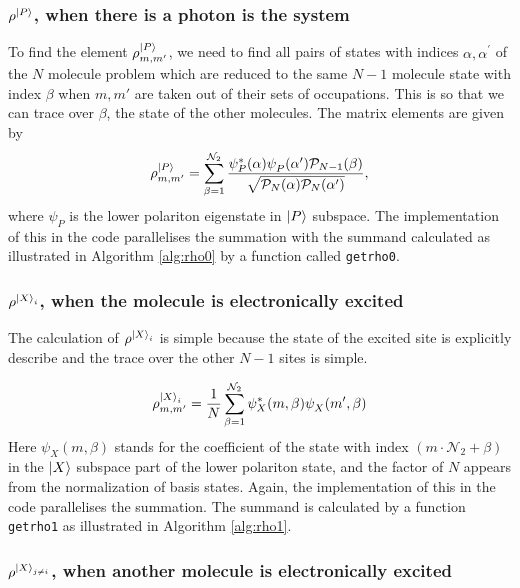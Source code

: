 \documentclass[final,twocolumn]{elsarticle}
\newcommand{\cntset}{\mathcal{P}_N}
\newcommand{\cntsetx}{\mathcal{P}_{N-1}}
\newcommand{\nb}{{\mathcal{N}_{2}}}
\begin{document}
\begin{small}
\subsubsection{$\rho^{\ket{P}}$, when there is a photon is the system}
To find the element $\rho^{\ket{P}}_{m,m^\prime}$, we need to find all pairs
of states with indices
$\alpha,\alpha^\prime$
of the $N$ molecule problem which are reduced to the same $N-1$
molecule state with index $\beta$ when $m,m'$ are taken out
of their sets of occupations.
This is so that we can trace over $\beta$, the state of
the other molecules.
The matrix elements are given by
\begin{equation}
  \label{eq:rho0}
  \rho^{\ket{P}}_{m,m'} = \sum_{\beta=1}^{\nb}
  \frac{\psi^\ast_{P}(\alpha) \psi^{}_{P}(\alpha^\prime) \cntsetx(\beta)
  }{\sqrt{\cntset(\alpha) \cntset(\alpha^\prime)}},
\end{equation}
where
$\psi_P$ is the lower polariton eigenstate in $\ket{P}$ subspace.
The implementation of this in the code
parallelises the summation with the
summand calculated as illustrated in Algorithm \ref{alg:rho0} by
a function called \texttt{getrho0}. 



\subsubsection{$\rho^{\ket{X}_i}$, when the molecule is electronically excited}
\label{sec:rho1}

The calculation of $\rho^{\ket{X}_i}$ is simple because the state of the excited site is 
explicitly describe and the trace over the other $N-1$ sites is simple.

\begin{equation}
  \label{eq:reduce_Xi}
  \rho^{\ket{X}_i}_{m,m'} = 
  \frac{1}{N}
  \sum_{\beta=1}^\nb
  \psi^\ast_{X}(m,\beta)  \psi^{}_{X}(m^\prime,\beta)  
\end{equation}
Here $\psi_{X}(m,\beta)$ stands for the coefficient of the state with index
$(m\cdot \nb+ \beta)$ in the $\ket{X}$ subspace part of the lower polariton state,
 and the factor of $N$ appears
from the normalization of basis states.
Again, the implementation of this in the code
parallelises the summation.
The summand is calculated by 
a function \texttt{getrho1} as
illustrated in Algorithm \ref{alg:rho1}.




\subsubsection{$\rho^{\ket{X}_{j \neq i}}$, when another molecule is electronically excited}


\end{small}
\end{document}
